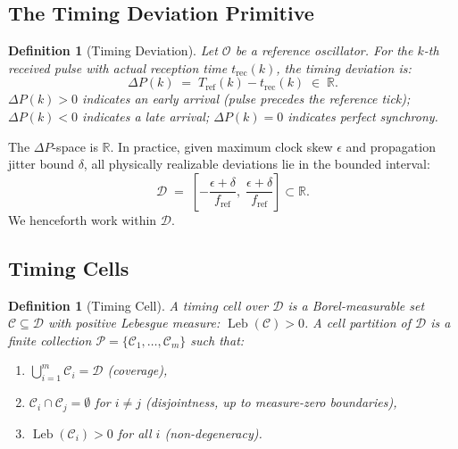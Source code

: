 \documentclass[twocolumn,10pt]{article}
\newtheorem{definition}[theorem]{Definition}
\newcommand{\DP}{\Delta P}          %
\newcommand{\Tref}{T_{\mathrm{ref}}}
\newcommand{\trec}{t_{\mathrm{rec}}}
\newcommand{\fref}{f_{\mathrm{ref}}}
\newcommand{\calC}{\mathcal{C}}     %
\newcommand{\calD}{\mathcal{D}}     %
\newcommand{\calP}{\mathcal{P}}     %
\DeclareMathOperator{\Leb}{Leb}
\begin{document}
\subsection{The Timing Deviation Primitive}

\begin{definition}[Timing Deviation]
\label{def:dp}
Let $\mathcal{O}$ be a reference oscillator. For the $k$-th received
pulse with actual reception time $\trec(k)$, the \emph{timing
deviation} is:
\begin{equation}
  \DP(k) \;=\; \Tref(k) - \trec(k) \;\in\; \mathbb{R}.
  \label{eq:dp}
\end{equation}
$\DP(k) > 0$ indicates an early arrival (pulse precedes the reference
tick); $\DP(k) < 0$ indicates a late arrival; $\DP(k) = 0$ indicates
perfect synchrony.
\end{definition}

The $\DP$-space is $\mathbb{R}$. In practice, given maximum clock skew
$\epsilon$ and propagation jitter bound $\delta$, all physically
realizable deviations lie in the bounded interval:
\begin{equation}
  \calD \;=\; \left[
    -\frac{\epsilon + \delta}{\fref},\;
    \frac{\epsilon + \delta}{\fref}
  \right] \subset \mathbb{R}.
  \label{eq:dpspace}
\end{equation}
We henceforth work within $\calD$.

\subsection{Timing Cells}

\begin{definition}[Timing Cell]
\label{def:cell}
A \emph{timing cell} over $\calD$ is a Borel-measurable set
$\calC \subseteq \calD$ with positive Lebesgue measure:
$\Leb(\calC) > 0$. A \emph{cell partition} of $\calD$ is a finite
collection $\calP = \{\calC_1, \ldots, \calC_m\}$ such that:
\begin{enumerate}[leftmargin=1.5em,topsep=2pt,itemsep=1pt]
  \item[(i)]   $\bigcup_{i=1}^{m} \calC_i = \calD$
    (coverage),
  \item[(ii)]  $\calC_i \cap \calC_j = \emptyset$ for $i \neq j$
    (disjointness, up to measure-zero boundaries),
  \item[(iii)] $\Leb(\calC_i) > 0$ for all $i$
    (non-degeneracy).
\end{enumerate}
\end{definition}
\end{document}
